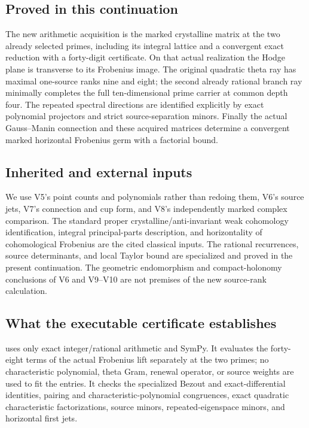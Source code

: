 \documentclass[11pt]{article}
\theoremstyle{definition}
\theoremstyle{remark}
\begin{document}
\subsection{Proved in this continuation}
The new arithmetic acquisition is the marked crystalline matrix at the
two already selected primes, including its integral lattice and a
convergent exact reduction with a forty-digit certificate. On that
actual realization the Hodge plane is transverse to its Frobenius image.
The original quadratic theta ray has maximal one-source ranks nine and
eight; the second already rational branch ray minimally completes the
full ten-dimensional prime carrier at common depth four. The repeated
spectral directions are identified explicitly by exact polynomial
projectors and strict source-separation minors. Finally the actual
Gauss--Manin connection and these acquired matrices determine a
convergent marked horizontal Frobenius germ with a factorial bound.

\subsection{Inherited and external inputs}
We use V5's point counts and polynomials rather than redoing them, V6's
source jets, V7's connection and cup form, and V8's independently marked
complex comparison. The standard proper crystalline/anti-invariant weak
cohomology identification, integral principal-parts description, and
horizontality of cohomological Frobenius are the cited classical inputs.
The rational recurrences, source determinants, and local Taylor bound
are specialized and proved in the present continuation. The geometric
endomorphism and compact-holonomy conclusions of V6 and V9--V10 are not
premises of the new source-rank calculation.

\subsection{What the executable certificate establishes}
 uses only
exact integer/rational arithmetic and SymPy. It evaluates the forty-eight
terms of the actual Frobenius lift separately at the two primes; no
characteristic polynomial, theta Gram, renewal operator, or source
weights are used to fit the entries. It checks the specialized Bezout
and exact-differential identities, pairing and characteristic-polynomial
congruences, exact quadratic characteristic factorizations, source
minors, repeated-eigenspace minors, and horizontal first jets.
\end{document}
